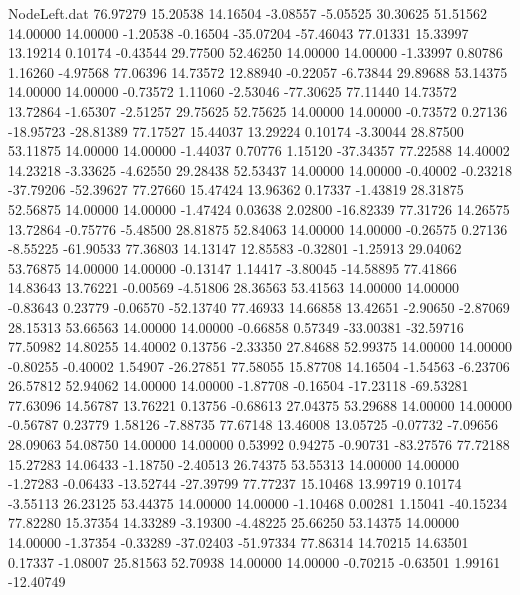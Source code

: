 \begin{filecontents}{NodeLeft.dat}
  76.97279   15.20538   14.16504    -3.08557   -5.05525   30.30625   51.51562   14.00000   14.00000   -1.20538   -0.16504  -35.07204  -57.46043
  77.01331   15.33997   13.19214     0.10174   -0.43544   29.77500   52.46250   14.00000   14.00000   -1.33997    0.80786    1.16260   -4.97568
  77.06396   14.73572   12.88940    -0.22057   -6.73844   29.89688   53.14375   14.00000   14.00000   -0.73572    1.11060   -2.53046  -77.30625
  77.11440   14.73572   13.72864    -1.65307   -2.51257   29.75625   52.75625   14.00000   14.00000   -0.73572    0.27136  -18.95723  -28.81389
  77.17527   15.44037   13.29224     0.10174   -3.30044   28.87500   53.11875   14.00000   14.00000   -1.44037    0.70776    1.15120  -37.34357
  77.22588   14.40002   14.23218    -3.33625   -4.62550   29.28438   52.53437   14.00000   14.00000   -0.40002   -0.23218  -37.79206  -52.39627
  77.27660   15.47424   13.96362     0.17337   -1.43819   28.31875   52.56875   14.00000   14.00000   -1.47424    0.03638    2.02800  -16.82339
  77.31726   14.26575   13.72864    -0.75776   -5.48500   28.81875   52.84063   14.00000   14.00000   -0.26575    0.27136   -8.55225  -61.90533
  77.36803   14.13147   12.85583    -0.32801   -1.25913   29.04062   53.76875   14.00000   14.00000   -0.13147    1.14417   -3.80045  -14.58895
  77.41866   14.83643   13.76221    -0.00569   -4.51806   28.36563   53.41563   14.00000   14.00000   -0.83643    0.23779   -0.06570  -52.13740
  77.46933   14.66858   13.42651    -2.90650   -2.87069   28.15313   53.66563   14.00000   14.00000   -0.66858    0.57349  -33.00381  -32.59716
  77.50982   14.80255   14.40002     0.13756   -2.33350   27.84688   52.99375   14.00000   14.00000   -0.80255   -0.40002    1.54907  -26.27851
  77.58055   15.87708   14.16504    -1.54563   -6.23706   26.57812   52.94062   14.00000   14.00000   -1.87708   -0.16504  -17.23118  -69.53281
  77.63096   14.56787   13.76221     0.13756   -0.68613   27.04375   53.29688   14.00000   14.00000   -0.56787    0.23779    1.58126   -7.88735
  77.67148   13.46008   13.05725    -0.07732   -7.09656   28.09063   54.08750   14.00000   14.00000    0.53992    0.94275   -0.90731  -83.27576
  77.72188   15.27283   14.06433    -1.18750   -2.40513   26.74375   53.55313   14.00000   14.00000   -1.27283   -0.06433  -13.52744  -27.39799
  77.77237   15.10468   13.99719     0.10174   -3.55113   26.23125   53.44375   14.00000   14.00000   -1.10468    0.00281    1.15041  -40.15234
  77.82280   15.37354   14.33289    -3.19300   -4.48225   25.66250   53.14375   14.00000   14.00000   -1.37354   -0.33289  -37.02403  -51.97334
  77.86314   14.70215   14.63501     0.17337   -1.08007   25.81563   52.70938   14.00000   14.00000   -0.70215   -0.63501    1.99161  -12.40749

\end{filecontents}
